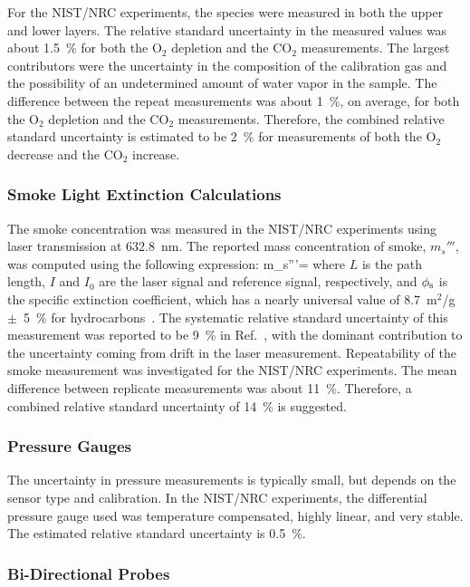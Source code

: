 For the NIST/NRC experiments, the species were measured in both the upper and lower layers. The relative standard uncertainty in the measured values was about 1.5~\% for both the O$_2$ depletion and the CO$_2$ measurements. The largest contributors were the uncertainty in the composition of the calibration gas and the possibility of an undetermined amount of water vapor in the sample. The difference between the repeat measurements was about 1~\%, on average, for both the O$_2$ depletion and the CO$_2$ measurements. Therefore, the combined relative standard uncertainty is estimated to be 2~\% for measurements of both the O$_2$ decrease and the CO$_2$ increase.

\subsubsection{Smoke Light Extinction Calculations}

The smoke concentration was measured in the NIST/NRC experiments using laser transmission at 632.8~nm. The reported mass concentration of smoke, $m_s'''$, was computed using the following expression:
\be
   m_s'''=
\ee
where $L$ is the path length, $I$ and $I_0$ are the laser signal and reference signal, respectively, and $\phi_{\rm s}$ is the specific extinction coefficient, which has a nearly universal value of 8.7~m$^2$/g~$\pm$~5~\% for hydrocarbons~\cite{Mulholland:F+M}. The systematic relative standard uncertainty of this measurement was reported to be 9~\% in Ref.~\cite{Hamins:SP1013-1}, with the dominant contribution to the uncertainty coming from drift in the laser measurement. Repeatability of the smoke measurement was investigated for the NIST/NRC experiments. The mean difference between replicate measurements was about 11~\%. Therefore, a combined relative standard uncertainty of 14~\% is suggested.

\subsubsection{Pressure Gauges}

The uncertainty in pressure measurements is typically small, but depends on the sensor type and calibration. In the NIST/NRC experiments, the differential pressure gauge used was temperature compensated, highly linear, and very stable. The estimated relative standard uncertainty is 0.5~\%. 

\subsubsection{Bi-Directional Probes}

